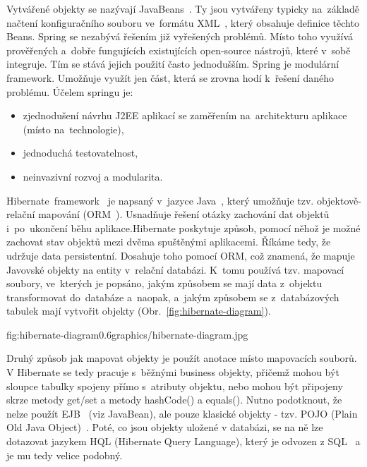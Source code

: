 
Vytvářené objekty se nazývají JavaBeans~\cite{java-beans}. Ty jsou vytvářeny typicky na~základě načtení konfiguračního souboru ve~formátu XML~\cite{xml}, který obsahuje definice těchto Beans. Spring se nezabývá řešením již vyřešených problémů. Místo toho využívá prověřených a~dobře fungujících existujících open-source nástrojů, které v~sobě integruje. Tím se stává jejich použití často jednodušším. Spring je modulární framework. Umožňuje využít jen část, která se zrovna hodí k~řešení daného problému. Účelem springu je:
\begin{itemize}
	\setlength{\parskip}{0pt}
	\setlength{\itemsep}{0pt}
	\item {zjednodušení návrhu J2EE aplikací se zaměřením na~architekturu aplikace (místo na~technologie),}
	\item {jednoduchá testovatelnost,}
	\item {neinvazivní rozvoj a modularita.}
\end{itemize}

Hibernate~framework~\cite{hibernate-framework} je napsaný v~jazyce Java~\cite{java}, který umožňuje tzv. objektově-relační mapování (ORM~\cite{orm}). Usnadňuje řešení otázky zachování dat objektů i~po~ukončení běhu aplikace.Hibernate poskytuje způsob, pomocí něhož je možné zachovat stav objektů mezi dvěma spuštěnými aplikacemi. Říkáme tedy, že udržuje data persistentní. Dosahuje toho pomocí ORM, což znamená, že mapuje Javovské objekty na entity v~relační databázi. K~tomu používá tzv. mapovací soubory, ve~kterých je popsáno, jakým způsobem se mají data z~objektu transformovat do~databáze a~naopak, a~jakým způsobem se z~databázových tabulek mají vytvořit objekty (Obr.~\ref{fig:hibernate-diagram}).

 {fig:hibernate-diagram}{0.6}{graphics/hibernate-diagram.jpg}

Druhý způsob jak mapovat objekty je použít anotace místo mapovacích souborů. V Hibernate se tedy pracuje s~běžnými business objekty, přičemž mohou být sloupce tabulky spojeny přímo s~atributy objektu, nebo mohou být připojeny skrze metody get/set a metody hashCode() a equals(). Nutno podotknout, že nelze použít EJB~\cite{enterprise-javabeans} (viz JavaBean), ale pouze klasické objekty - tzv. POJO (Plain Old Java Object)~\cite{pojo}. Poté, co jsou objekty uložené v databázi, se na ně lze dotazovat jazykem HQL (Hibernate Query Language), který je odvozen z SQL~\cite{sql} a je mu tedy velice podobný.

